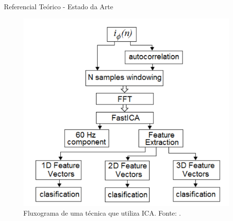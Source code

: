 \documentclass[aspectratio=169]{beamer}
\begin{document}

\begin{frame}{Referencial Teórico - Estado da Arte}
	\begin{figure}[HT]
		\begin{center}
			\includegraphics[scale=.35]{../referencial/img/ica_bracamonte_p4.png}
			\caption{Fluxograma de uma técnica que utiliza ICA. \newline
			Fonte: .} 
			\label{fig:ica_bracamonte_p4}
		\end{center}
	\end{figure}
\end{frame}

\end{document}
